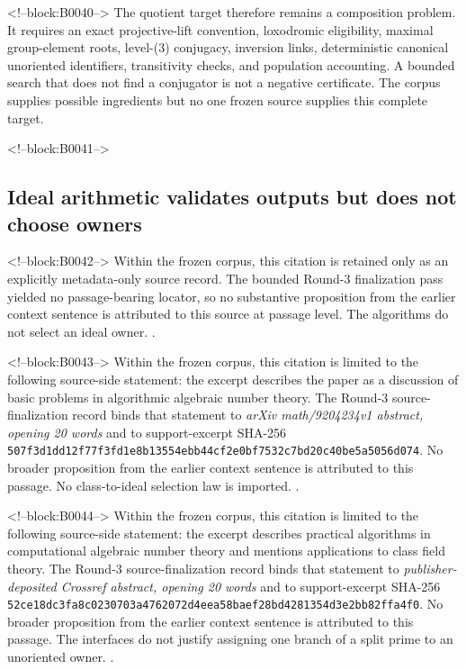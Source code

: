 \documentclass[11pt,a4paper]{article}
\begin{document}
<!--block:B0040-->
The quotient target therefore remains a composition problem. It requires an exact projective-lift convention, loxodromic eligibility, maximal group-element roots, level-(3) conjugacy, inversion links, deterministic canonical unoriented identifiers, transitivity checks, and population accounting. A bounded search that does not find a conjugator is not a negative certificate. The corpus supplies possible ingredients but no one frozen source supplies this complete target.

<!--block:B0041-->
\subsection{Ideal arithmetic validates outputs but does not choose owners}

<!--block:B0042-->
Within the frozen corpus, this citation is retained only as an explicitly metadata-only source record. The bounded Round-3 finalization pass yielded no passage-bearing locator, so no substantive proposition from the earlier context sentence is attributed to this source at passage level. The algorithms do not select an ideal owner.
\citep{P29-S19}.

<!--block:B0043-->
Within the frozen corpus, this citation is limited to the following source-side statement: the excerpt describes the paper as a discussion of basic problems in algorithmic algebraic number theory. The Round-3 source-finalization record binds that statement to \emph{arXiv math/9204234v1 abstract, opening 20 words} and to support-excerpt SHA-256 \texttt{507f3d1d\allowbreak{}d12f77f3\allowbreak{}fd1e8b13\allowbreak{}554ebb44\allowbreak{}cf2e0bf7\allowbreak{}532c7bd2\allowbreak{}0c40be5a\allowbreak{}5056d074}. No broader proposition from the earlier context sentence is attributed to this passage. No class-to-ideal selection law is imported.
\citep{P29-S20}.

<!--block:B0044-->
Within the frozen corpus, this citation is limited to the following source-side statement: the excerpt describes practical algorithms in computational algebraic number theory and mentions applications to class field theory. The Round-3 source-finalization record binds that statement to \emph{publisher-deposited Crossref abstract, opening 20 words} and to support-excerpt SHA-256 \texttt{52ce18dc\allowbreak{}3fa8c023\allowbreak{}0703a476\allowbreak{}2072d4ee\allowbreak{}a58baef2\allowbreak{}8bd42813\allowbreak{}54d3e2bb\allowbreak{}82ffa4f0}. No broader proposition from the earlier context sentence is attributed to this passage. The interfaces do not justify assigning one branch of a split prime to an unoriented owner.
\citep{P29-S21}.
\end{document}
